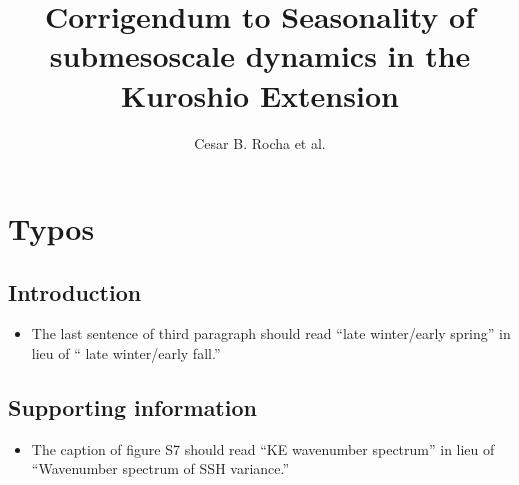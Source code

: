 \documentclass[11pt]{article}
\title{\bf \LARGE Corrigendum to Seasonality of submesoscale dynamics in the Kuroshio Extension}
\author{Cesar B. Rocha et al.}
\date{}
\newcommand{\sZ}{\mathsf{Z}}
\newcommand{\sE}{\mathsf{E}}
\begin{document}


\renewcommand{\sZ}{\mathsf{Z}}
\renewcommand{\sE}{\mathsf{E}}
\newcommand{\iBu}{\left(\tfrac{f_0}{N}\right)^2}
\newcommand{\F}{\mathcal{F}}
\newcommand{\D}{\mathcal{D}}
\renewcommand{\P}{\mathcal{P}}
\newcommand{\dU}{\delta U}
\newcommand{\W}{\mathcal{W}}
\newcommand{\cK}{\mathcal{K}}
\newcommand{\cP}{\mathcal{P}}
\renewcommand{\L}{\mathsf{L}}

%
%

\maketitle 

\section*{Typos}

\subsection*{Introduction}
    \begin{itemize}
        \item{The last sentence of third paragraph should read ``late winter/early spring'' in lieu of ``              late winter/early fall.''}
    \end{itemize}
    
\subsection*{Supporting information}
    \begin{itemize}
        \item{The caption of figure S7 should read ``KE wavenumber spectrum'' in lieu of ``Wavenumber spectrum of SSH variance.''}
    \end{itemize}

%
%
%
%
\end{document}
